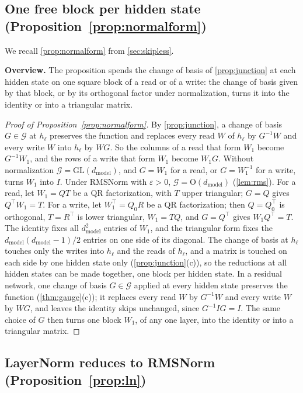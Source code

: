 \documentclass[10pt]{article}
\theoremstyle{definition}
\theoremstyle{remark}
\newcommand{\dm}{d_{\mathrm{model}}}
\newcommand{\GL}{\mathrm{GL}}
\newcommand{\Ort}{\mathrm{O}}
\newcommand{\G}{\mathcal{G}}
\newcommand{\para}[1]{\smallskip\noindent\textbf{#1}\hspace{0.5em}}
\begin{document}
\subsection{One free block per hidden state\texorpdfstring{ (Proposition~\ref*{prop:normalform})}{}}\label{app:prf-normalform}

We recall \cref{prop:normalform} from \cref{sec:skipless}.
\propNormalForm*

\para{Overview.} The proposition spends the change of basis of \cref{prop:junction} at each hidden state on one square block of a read or of a write: the change of basis given by that block, or by its orthogonal factor under normalization, turns it into the identity or into a triangular matrix.

\begin{proof}[Proof of Proposition~\ref{prop:normalform}]
By \cref{prop:junction}, a change of basis $G \in \G$ at $h_\ell$ preserves the function and replaces every read $W$ of $h_\ell$ by $G^{-1}W$ and every write $W$ into $h_\ell$ by $WG$. So the columns of a read that form $W_1$ become $G^{-1}W_1$, and the rows of a write that form $W_1$ become $W_1G$. Without normalization $\G = \GL(\dm)$, and $G = W_1$ for a read, or $G = W_1^{-1}$ for a write, turns $W_1$ into $I$. Under RMSNorm with $\varepsilon > 0$, $\G = \Ort(\dm)$ (\cref{lem:rms}). For a read, let $W_1 = QT$ be a QR factorization, with $T$ upper triangular; $G = Q$ gives $Q^\top W_1 = T$. For a write, let $W_1^\top = Q_0R$ be a QR factorization; then $Q = Q_0^\top$ is orthogonal, $T = R^\top$ is lower triangular, $W_1 = TQ$, and $G = Q^\top$ gives $W_1Q^\top = T$. The identity fixes all $\dm^2$ entries of $W_1$, and the triangular form fixes the $\dm(\dm-1)/2$ entries on one side of its diagonal. The change of basis at $h_\ell$ touches only the writes into $h_\ell$ and the reads of $h_\ell$, and a matrix is touched on each side by one hidden state only (\cref{prop:junction}(c)), so the reductions at all hidden states can be made together, one block per hidden state. In a residual network, one change of basis $G \in \G$ applied at every hidden state preserves the function (\cref{thm:gauge}(c)); it replaces every read $W$ by $G^{-1}W$ and every write $W$ by $WG$, and leaves the identity skips unchanged, since $G^{-1}IG = I$. The same choice of $G$ then turns one block $W_1$, of any one layer, into the identity or into a triangular matrix.
\end{proof}

\subsection{LayerNorm reduces to RMSNorm\texorpdfstring{ (Proposition~\ref*{prop:ln})}{}}\label{app:ln}
\end{document}
